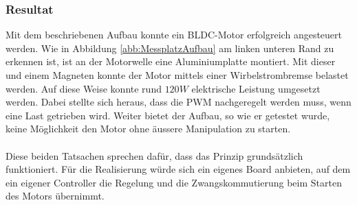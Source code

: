 \subsubsection{Resultat}
\label{chap:VersuchsResultat}
Mit dem beschriebenen Aufbau konnte ein BLDC-Motor erfolgreich angesteuert 
werden. Wie in Abbildung \ref{abb:MessplatzAufbau} am linken unteren Rand zu 
erkennen ist, ist an der Motorwelle eine Aluminiumplatte montiert. Mit dieser 
und einem Magneten konnte der Motor mittels einer Wirbelstrombremse belastet 
werden. Auf diese Weise konnte rund $120 W$ elektrische Leistung umgesetzt 
werden. Dabei stellte sich heraus, dass die PWM nachgeregelt werden muss, wenn 
eine Last getrieben wird. Weiter bietet der Aufbau, so wie er getestet wurde, 
keine Möglichkeit den Motor ohne äussere Manipulation zu starten.\\
\\
Diese beiden Tatsachen sprechen dafür, dass das Prinzip grundsätzlich 
funktioniert. Für die Realisierung würde sich ein eigenes Board anbieten, auf 
dem ein eigener Controller die Regelung und die Zwangskommutierung beim 
Starten des Motors übernimmt.
